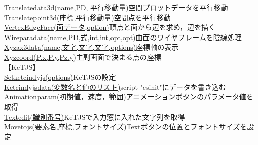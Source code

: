 \documentclass[papersize,a4paper,12pt,uplatex]{jsarticle}
\begin{document}
\begin{tabbing}
\hyperlink{translatedata3d}{Translatedata3d(name,PD, 平行移動量)}\>空間プロットデータを平行移動\\
\hyperlink{translatepoint3d}{Translatepoint3d(座標,平行移動量)}\>空間点を平行移動\\
\hyperlink{vertexedgeface}{VertexEdgeFace(面データ,option)}\>頂点と面から辺を求め，辺を描く\\
\hyperlink{wireparadata}{Wireparadata(name,PD,式,int,int,opt,opt)}\>曲面のワイヤフレームを陰線処理\\
\hyperlink{xyzax3data}{Xyzax3data(name,文字,文字,文字,options)}\>座標軸の表示\\
\hyperlink{xyzcoord}{Xyzcoord(P.x,P.y,Pz.y)}\>主副画面で決まる点の座標\\
【KeTJS】\\
\hyperlink{setketcindyjs}{Setketcindyjs(options)}\>KeTJSの設定\\
\hyperlink{ketcindyjsdata}{Ketcindyjsdata(変数名と値のリスト)}\>script "csinit"にデータを書き込む\\
\hyperlink{animationparam}{Animationparam(初期値，速度，範囲)}\>アニメーションボタンのパラメータ値を取得\\
\hyperlink{textedit}{Textedit(識別番号)}\>KeTJSで入力窓に入れた文字列を取得\\
\hyperlink{movetojs}{Movetojs(要素名,座標,フォントサイズ)}\>Textボタンの位置とフォントサイズを設定\\

\end{tabbing}
\end{document}
